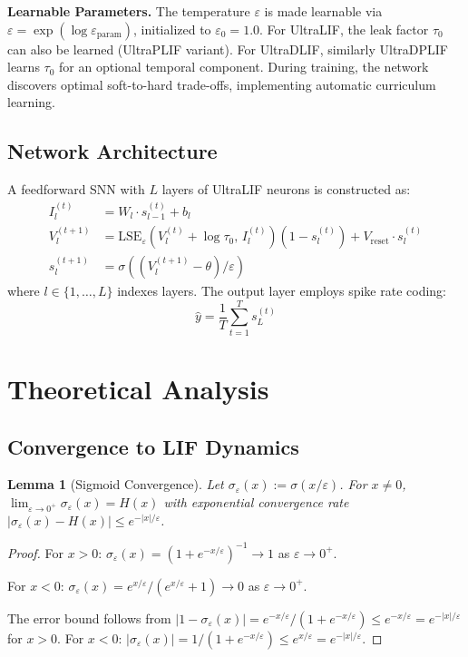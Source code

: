 \documentclass{article}
\theoremstyle{plain}
\newtheorem{lemma}[theorem]{Lemma}
\theoremstyle{definition}
\theoremstyle{remark}
\newcommand{\lse}{\mathrm{LSE}}
\newcommand{\eps}{\varepsilon}
\begin{document}
\textbf{Learnable Parameters.} The temperature $\eps$ is made learnable via $\eps = \exp(\log\eps_\text{param})$, initialized to $\eps_0 = 1.0$. For UltraLIF, the leak factor $\tau_0$ can also be learned (UltraPLIF variant). For UltraDLIF, similarly UltraDPLIF learns $\tau_0$ for an optional temporal component. During training, the network discovers optimal soft-to-hard trade-offs, implementing automatic curriculum learning.

\subsection{Network Architecture}
\label{sec:architecture}

A feedforward SNN with $L$ layers of UltraLIF neurons is constructed as:
\begin{align}
I_l^{(t)} &= W_l \cdot s_{l-1}^{(t)} + b_l \\
V_l^{(t+1)} &= \lse_\eps\left(V_l^{(t)} + \log\tau_0, \, I_l^{(t)}\right)(1 - s_l^{(t)}) + V_\text{reset} \cdot s_l^{(t)} \\
s_l^{(t+1)} &= \sigma\left((V_l^{(t+1)} - \theta) / \eps\right)
\end{align}
where $l \in \{1, \ldots, L\}$ indexes layers. The output layer employs spike rate coding:
\begin{equation}
\hat{y} = \frac{1}{T}\sum_{t=1}^T s_L^{(t)}
\end{equation}

\section{Theoretical Analysis}
\label{sec:theory}

\subsection{Convergence to LIF Dynamics}

\begin{lemma}[Sigmoid Convergence]
\label{lem:sigmoid}
Let $\sigma_\eps(x) := \sigma(x/\eps)$. For $x \neq 0$, $\lim_{\eps \to 0^+} \sigma_\eps(x) = H(x)$ with exponential convergence rate $|\sigma_\eps(x) - H(x)| \leq e^{-|x|/\eps}$.
\end{lemma}

\begin{proof}
For $x > 0$: $\sigma_\eps(x) = (1 + e^{-x/\eps})^{-1} \to 1$ as $\eps \to 0^+$.

For $x < 0$: $\sigma_\eps(x) = e^{x/\eps}/(e^{x/\eps} + 1) \to 0$ as $\eps \to 0^+$.

The error bound follows from $|1 - \sigma_\eps(x)| = e^{-x/\eps}/(1 + e^{-x/\eps}) \leq e^{-x/\eps} = e^{-|x|/\eps}$ for $x > 0$. For $x < 0$: $|\sigma_\eps(x)| = 1/(1 + e^{-x/\eps}) \leq e^{x/\eps} = e^{-|x|/\eps}$.
\end{proof}
\end{document}
